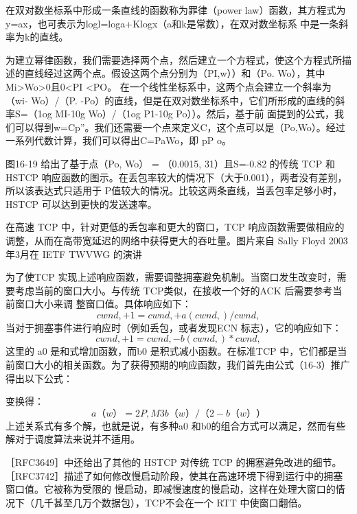 \begin{tcolorbox}
    在双对数坐标系中形成一条直线的函数称为罪律（power law）函数，其方程式为y=ax，也可表示为logl=loga+Klogx（a和k是常数），在双对数坐标系
    中是一条斜率为k的直线。
\end{tcolorbox}

为建立幂律函数，我们需要选择两个点，然后建立一个方程式，使这个方程式所描述的直线经过这两个点。假设这两个点分别为（PI,w））和（Po. Wo），其中Mi>Wo>0且0<PI <PO。
在一个线性坐标系中，这两个点会建立一个斜率为（wi- Wo）/（P. -Po）的直线，但是在双对数坐标系中，它们所形成的直线的斜率S=（1og MI-10g Wo）/（1og P1-10g Po））。然后，基于前
面提到的公式，我们可以得到w=Cp”。我们还需要一个点来定义C，这个点可以是（Po,Wo）。经过一系列代数计算，我们可以得出C=PaWo，即 pP o。

图16-19 给出了基于点（Po, Wo） = （0.0015, 31）且S=-0.82 的传统 TCP 和 HSTCP 响应函数的图示。在丢包率较大的情况下（大于0.001），两者没有差别，所以该表达式只适用于
P值较大的情况。比较这两条直线，当丢包率足够小时，HSTCP 可以达到更快的发送速率。

在高速 TCP 中，针对更低的丢包率和更大的窗口，TCP 响应函数需要做相应的调整，从而在高带宽延迟的网络中获得更大的吞吐量。图片来自 Sally Floyd 2003年3月在 IETF TWVWG
的演讲

为了使TCP 实现上述响应函数，需要调整拥塞避免机制。当窗口发生改变时，需要考虑当前的窗口大小。与传统 TCP类似，在接收一个好的ACK 后需要参考当前窗口大小来调
整窗口值。具体响应如下：
\begin{equation}
    cwnd, + 1 = cwnd, + a (cwnd,) /cwnd,
\end{equation}
当对于拥塞事件进行响应时（例如丢包，或者发现ECN 标志），它的响应如下：
\begin{equation}
    cwnd, + 1 = cwnd, - b (cwnd,) * cwnd,
\end{equation}
这里的 a0 是和式增加函数，而b0 是积式减小函数。在标准TCP 中，它们都是当前窗口大小的相关函数。为了获得预期的响应函数，我们首先由公式（16-3）推广得出以下公式：

变换得：
\begin{equation}
    a （w）=2P,M3b （w）/（2-b（w））
\end{equation}
上述关系式有多个解，也就是说，有多种a0 和b0的组合方式可以满足，然而有些解对于调度算法来说并不适用。

［RFC3649］中还给出了其他的 HSTCP 对传统 TCP 的拥塞避免改进的细节。［RFC3742］描述了如何修改慢启动阶段，使其在高速环境下得到运行中的拥塞窗口值。它被称为受限的
慢启动，即减慢速度的慢启动，这样在处理大窗口的情况下（几千甚至几万个数据包），TCP不会在一个 RTT 中使窗口翻倍。

